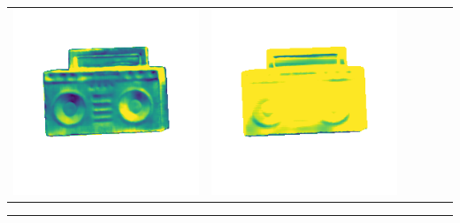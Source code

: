 \begin{center}
\begin{tabularx}{\linewidth}{@{}Y@{}Y@{}Y@{}Y@{}Y@{}Y@{}}
\includegraphics[width=\linewidth]{semisynthetic/20150514_19_marrnet_err.png} &
\includegraphics[width=\linewidth]{semisynthetic/20150514_19_ef_err.png} \\
\end{tabularx}
\begin{center}\rule{0.5\linewidth}{\linethickness}\end{center}


\end{center}
